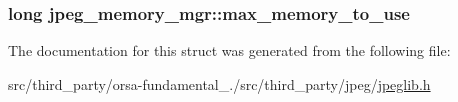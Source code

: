 \subsubsection[{max\+\_\+memory\+\_\+to\+\_\+use}]{\setlength{\rightskip}{0pt plus 5cm}long jpeg\+\_\+memory\+\_\+mgr\+::max\+\_\+memory\+\_\+to\+\_\+use}\label{structjpeg__memory__mgr_aa7ef7c0d7ffbfcbee837ae9cb8b12c7e}


The documentation for this struct was generated from the following file\+:\begin{DoxyCompactItemize}
\item 
src/third\+\_\+party/orsa-\/fundamental\+\_./src/third\+\_\+party/jpeg/\hyperlink{jpeglib_8h}{jpeglib.\+h}\end{DoxyCompactItemize}
